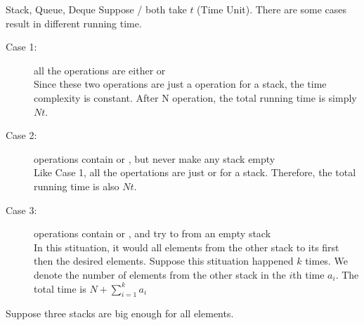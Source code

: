 \begin{homeworkProblem}{Stack, Queue, Deque}
    Suppose / both take $t$ (Time Unit).
    There are some cases result in different running time.
    \begin{description}
    \item[Case 1:] all the operations are either  or  \\
        Since these two operations are just a  operation for a stack, the 
        time complexity is constant. After N operation, the total running time is 
        simply $Nt$.
    \item[Case 2:] operations contain  or , but never make
        any stack empty \\
        Like Case 1, all the opertations are just  or  for a stack.
        Therefore, the total running time is also $Nt$.
    \item[Case 3:] operations contain  or , and try to 
        from an empty stack \\
        In this stituation, it would  all elements from the other stack to its 
        first then  the desired elements. Suppose this stituation happened $k$
        times. We denote the number of elements from the other stack in the $i$th time $a_i$.
        The total time is $N + \sum\limits_{i=1}^k a_i $

    \end{description}


    \pagebreak
    
    Suppose three stacks are big enough for all elements.

    \begin{figure}[h!]
        \centering
\end{figure}
\end{homeworkProblem}
